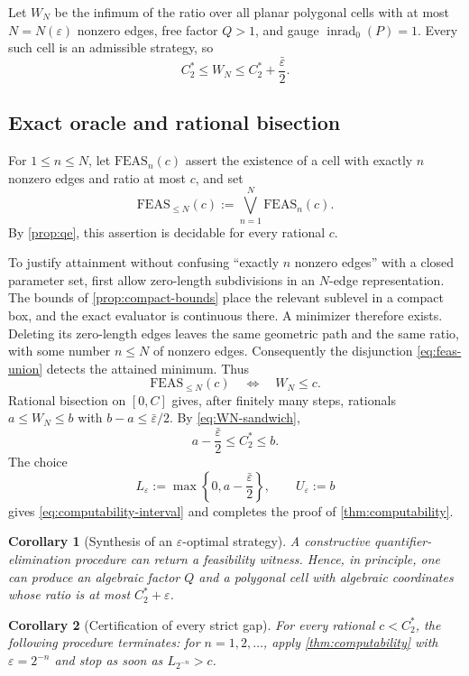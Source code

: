 \documentclass[10pt,a4paper]{article}
\newtheorem{corollary}[corollary]{Corollary}
\theoremstyle{definition}
\theoremstyle{remark}
\DeclareMathOperator{\inrad}{inrad}
\newcommand{\eps}{\varepsilon}
\begin{document}
Let $W_N$ be the infimum of the ratio over all planar polygonal cells with at most $N=N(\eps)$ nonzero edges, free factor $Q>1$, and gauge $\inrad_0(P)=1$. Every such cell is an admissible strategy, so
\begin{equation}
C_2^*\le W_N\le C_2^*+\frac{\bar\eps}{2}.
\label{eq:WN-sandwich}
\end{equation}

\subsection{Exact oracle and rational bisection}
For $1\le n\le N$, let $\mathrm{FEAS}_n(c)$ assert the existence of a cell with exactly $n$ nonzero edges and ratio at most $c$, and set
\begin{equation}
\mathrm{FEAS}_{\le N}(c):=\bigvee_{n=1}^N\mathrm{FEAS}_n(c).
\label{eq:feas-union}
\end{equation}
By \cref{prop:qe}, this assertion is decidable for every rational $c$.

To justify attainment without confusing ``exactly $n$ nonzero edges'' with a closed parameter set, first allow zero-length subdivisions in an $N$-edge representation. The bounds of \cref{prop:compact-bounds} place the relevant sublevel in a compact box, and the exact evaluator is continuous there. A minimizer therefore exists. Deleting its zero-length edges leaves the same geometric path and the same ratio, with some number $n\le N$ of nonzero edges. Consequently the disjunction \eqref{eq:feas-union} detects the attained minimum.
Thus
\[
\mathrm{FEAS}_{\le N}(c)\quad\Longleftrightarrow\quad W_N\le c.
\]
Rational bisection on $[0,C]$ gives, after finitely many steps, rationals $a\le W_N\le b$ with $b-a\le\bar\eps/2$. By \eqref{eq:WN-sandwich},
\[
a-\frac{\bar\eps}{2}\le C_2^*\le b.
\]
The choice
\[
L_\eps:=\max\left\{0,a-\frac{\bar\eps}{2}\right\},
\qquad
U_\eps:=b
\]
gives \eqref{eq:computability-interval} and completes the proof of \cref{thm:computability}.

\begin{corollary}[Synthesis of an $\eps$-optimal strategy]
\label{cor:synthesis}
A constructive quantifier-elimination procedure can return a feasibility witness. Hence, in principle, one can produce an algebraic factor $Q$ and a polygonal cell with algebraic coordinates whose ratio is at most $C_2^*+\eps$.
\end{corollary}

\begin{corollary}[Certification of every strict gap]
\label{cor:strict-gap}
For every rational $c<C_2^*$, the following procedure terminates: for $n=1,2,\ldots$, apply \cref{thm:computability} with $\eps=2^{-n}$ and stop as soon as $L_{2^{-n}}>c$.
\end{corollary}
\end{document}
